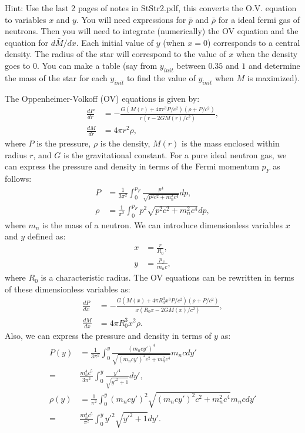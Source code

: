 Hint: Use the last 2 pages of notes in StStr2.pdf, this converts the O.V. equation to variables $x$ and $y$. You will need expressions for $\bar{p}$ and $\bar{\rho}$ for a ideal fermi gas of neutrons. Then you will need to integrate (numerically) the OV equation and the equation for $d\bar{M}/dx$. Each initial value of $y$ (when $x=0$) corresponds to a central density. The radius of the star will correspond to the value of $x$ when the density goes to $0$. You can make a table (say
from $y_{init}$ between $0.35$ and $1$ and determine the mass of the star for each $y_{init}$ to find the value of $y_{init}$ when $M$ is maximized).

\answer{}
The Oppenheimer-Volkoff (OV) equations is given by:
\begin{align}
    \frac{dP}{dr} &= -\frac{G(M(r) + 4\pi r^3 P/c^2)(\rho + P/c^2)}{r(r-2GM(r)/c^2)}, \\
    \frac{dM}{dr} &= 4\pi r^2 \rho,
\end{align}
where $P$ is the pressure, $\rho$ is the density, $M(r)$ is the mass enclosed within radius $r$, and $G$ is the gravitational constant. For a pure ideal neutron gas, we can express the pressure and density in terms of the Fermi momentum $p_F$ as follows:
\begin{align}
    P &= \frac{1}{3\pi^2} \int_0^{p_F} \frac{p^4}{\sqrt{p^2 c^2 + m_n^2 c^4}} dp, \\
    \rho &= \frac{1}{\pi^2} \int_0^{p_F} p^2 \sqrt{p^2 c^2 + m_n^2 c^4} dp,
\end{align}
where $m_n$ is the mass of a neutron. We can introduce dimensionless variables $x$ and $y$ defined as:
\begin{align}
    x &= \frac{r}{R_0}, \\
    y &= \frac{p_F}{m_n c},
\end{align}
where $R_0$ is a characteristic radius. The OV equations can be rewritten in terms of these dimensionless variables as:
\begin{align}
    \frac{dP}{dx} &= -\frac{G(M(x) + 4\pi R_0^3 x^3 P/c^2)(\rho + P/c^2)}{ x (R_0x - 2GM(x)/c^2)}, \\
    \frac{dM}{dx} &= 4\pi R_0^3 x^2 \rho.
\end{align}
Also, we can express the pressure and density in terms of $y$ as:
\begin{align}
    P(y) &= \frac{1}{3\pi^2} \int_0^{y} \frac{(m_n c y')^4}{\sqrt{(m_n c y')^2 c^2 + m_n^2 c^4}} m_ncdy'\\
    =& \frac{m_n^4 c^5}{3\pi^2} \int_0^{y} \frac{y'^4}{\sqrt{y'^2 + 1}} dy', \\
    \rho(y) &= \frac{1}{\pi^2} \int_0^{y} (m_n c y')^2 \sqrt{(m_n c y')^2 c^2 + m_n^2 c^4} m_ncdy'\\
    =& \frac{m_n^4 c^5}{\pi^2} \int_0^{y} y'^2 \sqrt{y'^2 + 1} dy'.
\end{align}
